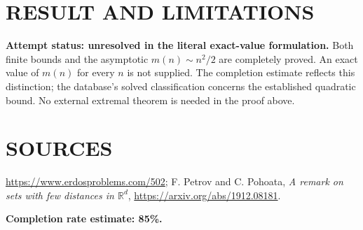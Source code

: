 \section{RESULT AND LIMITATIONS}
\textbf{Attempt status: unresolved in the literal exact-value formulation.} Both finite bounds and the asymptotic $m(n)\sim n^2/2$ are completely proved. An exact value of $m(n)$ for every $n$ is not supplied. The completion estimate reflects this distinction; the database's solved classification concerns the established quadratic bound. No external extremal theorem is needed in the proof above.

\section{SOURCES}
\url{https://www.erdosproblems.com/502}; F. Petrov and C. Pohoata, \emph{A remark on sets with few distances in $\mathbb R^d$}, \url{https://arxiv.org/abs/1912.08181}.

\textbf{Completion rate estimate: 85\%.}
